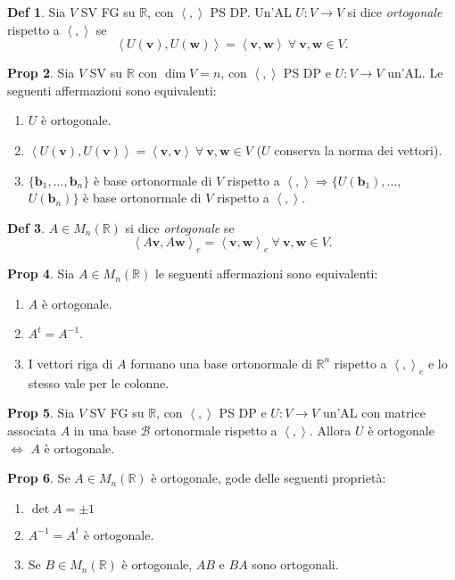 \documentclass[]{article}
\newcommand{\vv}{\mathbf{v}}
\newcommand{\vw}{\mathbf{w}}
\newcommand{\vb}{\mathbf{b}}
\newcommand{\scalprod}[2]{\left\langle #1 , #2 \right\rangle}
\theoremstyle{definition}
\theoremstyle{definition}
\newtheorem{prop}{Prop}[subsection]
\theoremstyle{definition}
\newtheorem{dfn}[prop]{Def}
\begin{document}
\begin{dfn} Sia $V$ SV FG su $\mathbb{R}$, con $\scalprod{}{}$ PS DP. Un'AL $U:V \to V$ si dice \emph{ortogonale} rispetto a $\scalprod{}{}$ se $$\scalprod{U(\vv )}{U(\vw )} = \scalprod{\vv}{\vw} \ \forall \ \vv , \vw \in V.$$

\end{dfn} \begin{prop} Sia $V$ SV su $\mathbb{R}$ con $\dim V =n$, con $\scalprod{}{}$ PS DP e $U:V \to V$ un'AL. Le seguenti affermazioni sono equivalenti:
\begin{enumerate}
	\item $U$ è ortogonale.
	\item $\scalprod{U(\vv )}{U(\vv )} = \scalprod{\vv}{\vv} \ \forall \ \vv , \vw \in V$ ($U$ conserva la norma dei vettori).
	\item $\{ \vb _1 ,..., \vb _n \}$ è base ortonormale di $V$ rispetto a $\scalprod{}{} \Rightarrow 
	\{ U(\vb _1),...,$ $U(\vb _n) \}$ è base ortonormale di $V$ rispetto a $\scalprod{}{}$.
\end{enumerate}

\end{prop} \begin{dfn} $A \in M_n (\mathbb{R})$ si dice \emph{ortogonale} se $$\scalprod{A \vv}{A \vw} _e = \scalprod{\vv}{\vw} _e \ \forall \ \vv , \vw \in V.$$

\end{dfn} \begin{prop} Sia $A \in M_n (\mathbb{R})$ le seguenti affermazioni sono equivalenti:
\begin{enumerate}
	\item $A$ è ortogonale.
	\item $A^t=A^{-1}$.
	\item I vettori riga di $A$ formano una base ortonormale di $\mathbb{R}^n$ rispetto a $\scalprod{}{} _e$ e lo stesso vale per le colonne.
\end{enumerate}

\end{prop} \begin{prop} Sia $V$ SV FG su $\mathbb{R}$, con $\scalprod{}{}$ PS DP e $U:V \to V$ un'AL con matrice associata $A$ in una base $\mathcal{B}$ ortonormale rispetto a $\scalprod{}{}$. Allora $U$ è ortogonale $\Leftrightarrow$ $A$ è ortogonale.

\end{prop} \begin{prop} Se $A \in M_n (\mathbb{R})$ è ortogonale, gode delle seguenti proprietà:
\begin{enumerate}
	\item $\det A = \pm 1$
	\item $A^{-1}=A^t$ è ortogonale.
	\item Se $B \in M_n (\mathbb{R})$ è ortogonale, $AB$ e $BA$ sono ortogonali.
\end{enumerate}


\end{prop}
\end{document}
